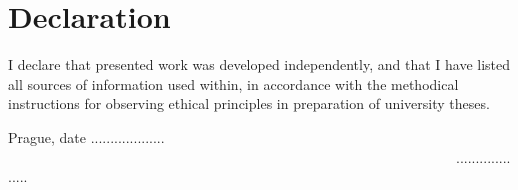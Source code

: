 \vspace{10cm}

\section*{Declaration}
I declare that presented work was developed independently, and that I have listed all
sources of information used within, in accordance with the methodical instructions for
observing ethical principles in preparation of university theses.

\vspace{2cm}
Prague, date ................... \ \ \ \ \ \ \ \ \ \ \ \ \ \ \ \ \ \ \ \ \ \ \ \ \ \ \ \ \ \ \ \ \ \ \ \ \ \ \ \ \ \ \ \ \ \ \ \ \ \ \ \ \ \ \ \ \ \ \ \ \ \ \ \ ................... 





